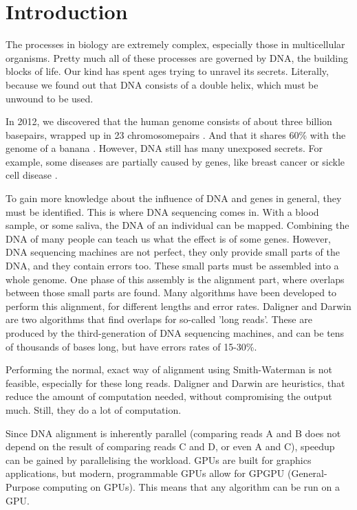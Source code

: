 \documentclass[../main/thesis.tex]{subfiles}
\begin{document}
\chapter{Introduction}
\ifdefined\main
\else

\fi

The processes in biology are extremely complex, especially those in multicellular organisms.
Pretty much all of these processes are governed by DNA, the building blocks of life.
Our kind has spent ages trying to unravel its secrets.
Literally, because we found out that DNA consists of a double helix, which must be unwound to be used.

In 2012, we discovered that the human genome consists of about three billion basepairs, wrapped up in 23 chromosomepairs \cite{human_genome_project}.
And that it shares 60\% with the genome of a banana \cite{banana}.
However, DNA still has many unexposed secrets.
For example, some diseases are partially caused by genes, like breast cancer or sickle cell disease \cite{genomic_diseases}.

To gain more knowledge about the influence of DNA and genes in general, they must be identified.
This is where DNA sequencing comes in.
With a blood sample, or some saliva, the DNA of an individual can be mapped.
Combining the DNA of many people can teach us what the effect is of some genes.
However, DNA sequencing machines are not perfect, they only provide small parts of the DNA, and they contain errors too.
These small parts must be assembled into a whole genome.
One phase of this assembly is the alignment part, where overlaps between those small parts are found.
Many algorithms have been developed to perform this alignment, for different lengths and error rates.
Daligner and Darwin are two algorithms that find overlaps for so-called 'long reads'.
These are produced by the third-generation of DNA sequencing machines, and can be tens of thousands of bases long, but have errors rates of 15-30\%.

Performing the normal, exact way of alignment using Smith-Waterman is not feasible, especially for these long reads.
Daligner and Darwin are heuristics, that reduce the amount of computation needed, without compromising the output much.
Still, they do a lot of computation.

Since DNA alignment is inherently parallel (comparing reads A and B does not depend on the result of comparing reads C and D, or even A and C), speedup can be gained by parallelising the workload.
GPUs are built for graphics applications, but modern, programmable GPUs allow for GPGPU (General-Purpose computing on GPUs).
This means that any algorithm can be run on a GPU.
\end{document}
